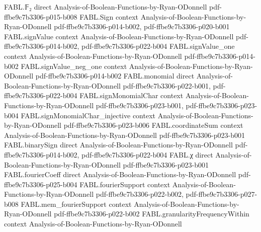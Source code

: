 \begin{theorem}
\label{FABL.expect_sq_ambientRestrictionFourierCoeff}
\leanok
{}
\proofstep
  {FABL.𝔽₂}
  {direct}
  {Analysis-of-Boolean-Functions-by-Ryan-ODonnell}
  {pdf-ffbe9c7b3306-p015-b008}
\proofstep
  {FABL.Sign}
  {context}
  {Analysis-of-Boolean-Functions-by-Ryan-ODonnell}
  {pdf-ffbe9c7b3306-p014-b002,
    pdf-ffbe9c7b3306-p020-b001}
\proofstep
  {FABL.signValue}
  {context}
  {Analysis-of-Boolean-Functions-by-Ryan-ODonnell}
  {pdf-ffbe9c7b3306-p014-b002,
    pdf-ffbe9c7b3306-p022-b004}
\proofstep
  {FABL.signValue_one}
  {context}
  {Analysis-of-Boolean-Functions-by-Ryan-ODonnell}
  {pdf-ffbe9c7b3306-p014-b002}
\proofstep
  {FABL.signValue_neg_one}
  {context}
  {Analysis-of-Boolean-Functions-by-Ryan-ODonnell}
  {pdf-ffbe9c7b3306-p014-b002}
\proofstep
  {FABL.monomial}
  {direct}
  {Analysis-of-Boolean-Functions-by-Ryan-ODonnell}
  {pdf-ffbe9c7b3306-p022-b001,
    pdf-ffbe9c7b3306-p022-b004}
\proofstep
  {FABL.signMonomialChar}
  {context}
  {Analysis-of-Boolean-Functions-by-Ryan-ODonnell}
  {pdf-ffbe9c7b3306-p023-b001,
    pdf-ffbe9c7b3306-p023-b004}
\proofstep
  {FABL.signMonomialChar_injective}
  {context}
  {Analysis-of-Boolean-Functions-by-Ryan-ODonnell}
  {pdf-ffbe9c7b3306-p023-b006}
\proofstep
  {FABL.coordinateSum}
  {context}
  {Analysis-of-Boolean-Functions-by-Ryan-ODonnell}
  {pdf-ffbe9c7b3306-p023-b001}
\proofstep
  {FABL.binarySign}
  {direct}
  {Analysis-of-Boolean-Functions-by-Ryan-ODonnell}
  {pdf-ffbe9c7b3306-p014-b002,
    pdf-ffbe9c7b3306-p022-b004}
\proofstep
  {FABL.χ}
  {direct}
  {Analysis-of-Boolean-Functions-by-Ryan-ODonnell}
  {pdf-ffbe9c7b3306-p023-b001}
\proofstep
  {FABL.fourierCoeff}
  {direct}
  {Analysis-of-Boolean-Functions-by-Ryan-ODonnell}
  {pdf-ffbe9c7b3306-p025-b004}
\proofstep
  {FABL.fourierSupport}
  {context}
  {Analysis-of-Boolean-Functions-by-Ryan-ODonnell}
  {pdf-ffbe9c7b3306-p022-b002,
    pdf-ffbe9c7b3306-p027-b008}
\proofstep
  {FABL.mem_fourierSupport}
  {context}
  {Analysis-of-Boolean-Functions-by-Ryan-ODonnell}
  {pdf-ffbe9c7b3306-p022-b002}
\proofstep
  {FABL.granularityFrequencyWithin}
  {context}
  {Analysis-of-Boolean-Functions-by-Ryan-ODonnell}

\end{theorem}
